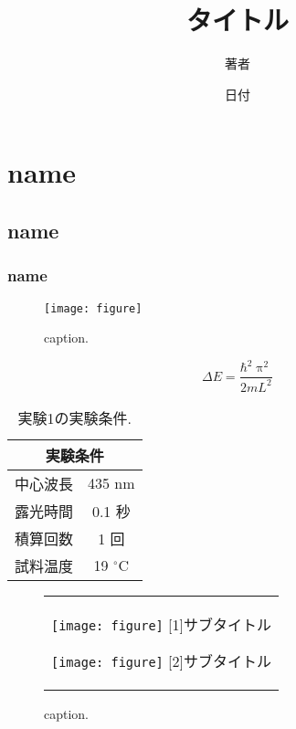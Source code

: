 \documentclass[11pt]{jsarticle}%
\title{タイトル}%
\author{著者}%
\date{日付}%
\begin{document}
\maketitle%
\tableofcontents%
\listoffigures%

\section{name}%

\subsection{name}%

\subsubsection{name}%

\begin{figure}[h]%
 \centering%
 \texttt{[image: figure]}%
 \caption{caption.}%
 \label{label}%
\end{figure}%

\begin{equation}%
 \Delta E=\frac{\mathrm{\hbar}^{2}\uppi^{2}}{2mL^{2}}%
 \label{eq_qw}%
\end{equation}%

\begin{table}[ht]%
 \centering
 \caption{実験1の実験条件.}
 \begin{tabular}{lc}\hline
  \multicolumn{2}{c}{実験条件} \\ \hline
  中心波長 & 435 nm            \\
  露光時間 & 0.1 秒            \\
  積算回数 & 1 回              \\
  試料温度 & 19 ${}^\circ$C    \\ \hline
 \end{tabular}
 \label{col_1}%
\end{table}%

\begin{figure}[ht]%
 \centering%
 \begin{tabular}{c}%
  \begin{minipage}{0.5\hsize}%
   \centering
   \texttt{[image: figure]}
   \hspace{1.6cm} [1]サブタイトル%
  \end{minipage}

  \begin{minipage}{0.33\hsize}
   \centering
   \texttt{[image: figure]}
   \hspace{1.6cm} [2]サブタイトル%
  \end{minipage}
 \end{tabular}%
 \caption{caption.}%
 \label{label}%

\end{figure}
\end{document}
